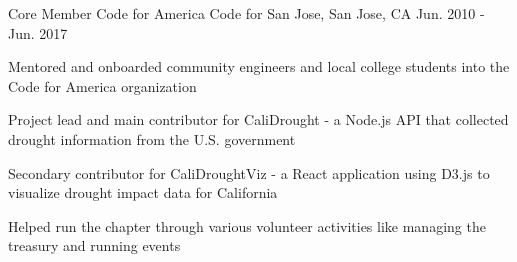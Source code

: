 

\begin{cventries}

  \cventry
    {Core Member} %
    {Code for America} %
    {Code for San Jose, San Jose, CA} %
    {Jun. 2010 - Jun. 2017} %
    {
      \begin{cvitems} %
        \item {Mentored and onboarded community engineers and local college students into the Code for America organization}
        \item {Project lead and main contributor for CaliDrought - a Node.js API that collected drought information from the U.S. government}
        \item {Secondary contributor for CaliDroughtViz - a React application using D3.js to visualize drought impact data for California}
        \item {Helped run the chapter through various volunteer activities like managing the treasury and running events}
      \end{cvitems}
    }
\end{cventries}
